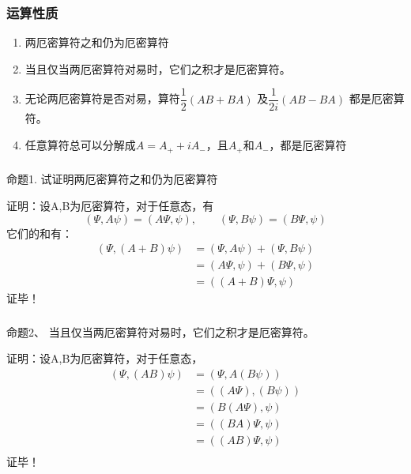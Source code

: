 \begin{frame}
    \frametitle{运算性质}
    \begin{enumerate}
        \item 两厄密算符之和仍为厄密算符
        \item 当且仅当两厄密算符对易时，它们之积才是厄密算符。
        \item 无论两厄密算符是否对易，算符$\dfrac{1}{2}(AB+BA)$ 及$\dfrac{1}{2i}(AB-BA) $  都是厄密算符。
        \item 任意算符总可以分解成$A=A_+ +iA_-$，且$A_+$和$A_-$，都是厄密算符
    \end{enumerate}
\end{frame} 

\begin{frame} [allowframebreaks=]
    \frametitle{}
    \begin{atcbox}{命题1.}
     试证明两厄密算符之和仍为厄密算符 
    \end{atcbox}
    \alert{证明：}设A,B为厄密算符，对于任意态，有\\
    $$(\Psi, A\psi ) = (A\Psi, \psi), \qquad (\Psi, B\psi ) = (B\Psi, \psi)$$
    它们的和有： 
    \begin{equation*}
        \begin{split}
            (\Psi, (A+B)\psi ) &= (\Psi, A\psi ) + (\Psi, B\psi ) \\  
            &=(A\Psi, \psi ) + (B\Psi, \psi ) \\
            &=((A+B)\Psi, \psi ) 
         \end{split}
    \end{equation*}  
    证毕！
\end{frame} 

\begin{frame} [allowframebreaks=]
    \frametitle{}
    \begin{atcbox}{命题2、}
        当且仅当两厄密算符对易时，它们之积才是厄密算符。
    \end{atcbox}
    \alert{证明：}设A,B为厄密算符，对于任意态，
    \begin{equation*}
        \begin{split}
            (\Psi, (AB)\psi ) &= (\Psi, A(B\psi) ) \\  
            &=((A \Psi), (B\psi) )  \\
            &=(B(A \Psi), \psi )  \\
            &=( (BA) \Psi, \psi )  \\
            &=( (AB) \Psi, \psi )  \\
         \end{split}
    \end{equation*}  
    证毕！
\end{frame}  

